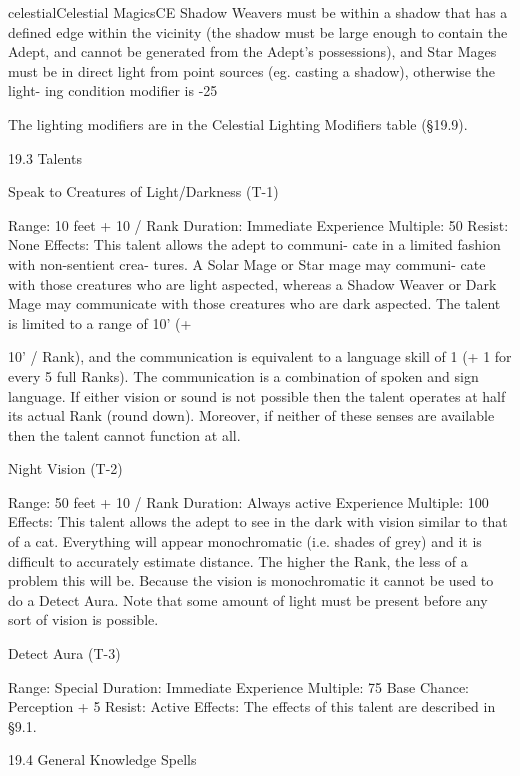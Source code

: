\begin{College}[1.3]{celestial}{Celestial Magics}{CE}
Shadow Weavers must be within a shadow that has 
a  defined  edge  within  the  vicinity  (the  shadow 
must  be  large  enough  to  contain  the  Adept,  and 
cannot be generated from the Adept’s possessions), 
and  Star  Mages  must  be  in  direct  light  from point 
sources (eg. casting a shadow), otherwise the light-
ing condition modifier is -25%

The lighting modifiers are in the Celestial Lighting 
Modifiers table (§19.9). 

19.3 Talents 

Speak to Creatures of Light/Darkness (T-1) 

Range: 10 feet + 10 / Rank 
Duration: Immediate 
Experience Multiple: 50 
Resist: None 
Effects:  This  talent  allows  the  adept  to  communi-
cate  in  a  limited  fashion  with  non-sentient  crea-
tures.  A  Solar  Mage  or  Star  mage  may  communi-
cate  with  those  creatures  who  are  light  aspected, 
whereas  a  Shadow  Weaver  or  Dark  Mage  may 
communicate  with  those  creatures  who  are  dark 
aspected. The talent is limited to a range of 10’ (+ 

10’  /  Rank),  and  the  communication  is  equivalent 
to a language skill of 1 (+ 1 for every 5 full Ranks). 
The  communication  is  a  combination  of  spoken 
and  sign  language.  If  either  vision  or  sound is  not 
possible  then  the  talent  operates  at  half  its  actual 
Rank  (round  down).  Moreover,  if  neither  of  these 
senses are available then the talent cannot function 
at all. 

Night Vision (T-2) 

Range: 50 feet + 10 / Rank 
Duration: Always active 
Experience Multiple: 100 
Effects:  This  talent  allows  the  adept  to  see  in  the 
dark with vision similar to that of a cat. Everything 
will  appear  monochromatic  (i.e.  shades  of  grey) 
and  it  is  difficult  to  accurately  estimate  distance. 
The higher the Rank, the less of a problem this will 
be. Because the vision is monochromatic it cannot 
be  used  to  do  a  Detect  Aura.  Note  that  some 
amount of light must be present before any sort of 
vision is possible. 

Detect Aura (T-3) 

Range: Special 
Duration: Immediate 
Experience Multiple: 75 
Base Chance: Perception + 5%
Resist: Active 
Effects:  The  effects  of  this  talent  are  described  in 
§9.1. 

19.4 General Knowledge Spells 


\end{College}
